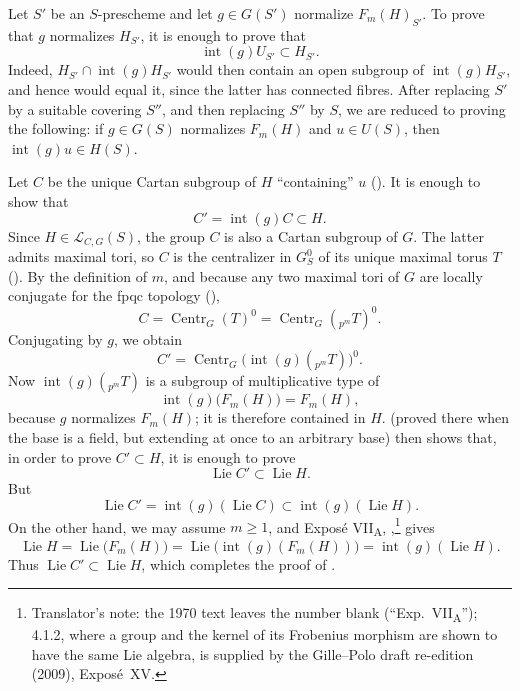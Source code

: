 Let \(S'\) be an \(S\)-prescheme and let \(g\in G(S')\) normalize
\(F_m(H)_{S'}\). To prove that \(g\) normalizes \(H_{S'}\), it is enough to
prove that
\[
\operatorname{int}(g)U_{S'}\subset H_{S'}.
\]
Indeed, \(H_{S'}\cap\operatorname{int}(g)H_{S'}\) would then contain an open
subgroup of \(\operatorname{int}(g)H_{S'}\), and hence would equal it, since
the latter has connected fibres. After replacing \(S'\) by a suitable
covering \(S''\), and then replacing \(S''\) by \(S\), we are reduced to
proving the following: if \(g\in G(S)\) normalizes \(F_m(H)\) and
\(u\in U(S)\), then \(\operatorname{int}(g)u\in H(S)\).

Let \(C\) be the unique Cartan subgroup of \(H\) ``containing'' \(u\)
(). It is enough to show that
\[
C'=\operatorname{int}(g)C\subset H.
\]
Since \(H\in\mathcal L_{C,G}(S)\), the group \(C\) is also a Cartan subgroup
of \(G\). The latter admits maximal tori, so \(C\) is the centralizer in
\(G_S^0\) of its unique maximal torus \(T\) ().
By the definition of \(m\), and because any two maximal tori of \(G\) are
locally conjugate for the fpqc topology (),
\[
C=\operatorname{Centr}_G(T)^0
 =\operatorname{Centr}_G({}_{p^m}T)^0.
\]
Conjugating by \(g\), we obtain
\[
C'=\operatorname{Centr}_G\bigl(\operatorname{int}(g)({}_{p^m}T)\bigr)^0.
\]
Now \(\operatorname{int}(g)({}_{p^m}T)\) is a subgroup of multiplicative
type of
\[
\operatorname{int}(g)\bigl(F_m(H)\bigr)=F_m(H),
\]
because \(g\) normalizes \(F_m(H)\); it is therefore contained in \(H\).
 (proved there when the base is a field, but extending at
once to an arbitrary base) then shows that, in order to prove
\(C'\subset H\), it is enough to prove
\[
\operatorname{Lie}C'\subset\operatorname{Lie}H.
\]
But
\[
\operatorname{Lie}C'
 =\operatorname{int}(g)(\operatorname{Lie}C)
 \subset\operatorname{int}(g)(\operatorname{Lie}H).
\]
On the other hand, we may assume \(m\geq1\), and Exposé
VII\textsubscript{A}, ,\footnote{Translator's note: the 1970 text leaves the number blank (``Exp.~VII\textsubscript{A}''); 4.1.2, where a group and the kernel of its Frobenius morphism are shown to have the same Lie algebra, is supplied by the Gille--Polo draft re-edition (2009), Exposé~XV.} gives
\[
\operatorname{Lie}H
 =\operatorname{Lie}\bigl(F_m(H)\bigr)
 =\operatorname{Lie}\bigl(\operatorname{int}(g)(F_m(H))\bigr)
 =\operatorname{int}(g)(\operatorname{Lie}H).
\]
Thus \(\operatorname{Lie}C'\subset\operatorname{Lie}H\), which completes
the proof of .

